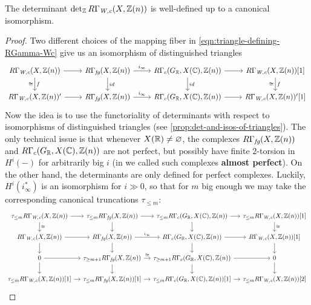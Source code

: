 \documentclass{article}
\numberwithin{equation}{section}
\begin{document}
\begin{lemma}
  \label{lemma:determinant-of-RGamma-Wc-well-defined}
  The determinant $\operatorname{det}_{\mathbb{Z}} R\Gamma_{\text{\it W,c}} (X, \mathbb{Z}(n))$ is well-defined up to a
  canonical isomorphism.

  \begin{proof}
    Two different choices of the mapping fiber in
    \eqref{eqn:triangle-defining-RGamma-Wc} give us an isomorphism of
    distinguished triangles
    \[ \begin{tikzcd}
        R\Gamma_\Wc (X, \ZZ(n)) \ar{r}\ar{d}{f}[swap]{\cong} & R\Gamma_\fg (X,\ZZ(n)) \ar{r}{i_\infty}\ar{d}{id} & R\Gamma_c (G_\RR, X (\CC), \ZZ (n)) \ar{r}\ar{d}{id} & R\Gamma_\Wc (X, \ZZ (n)) [1]\ar{d}{f}[swap]{\cong} \\
        R\Gamma_\Wc (X, \ZZ(n))' \ar{r} & R\Gamma_\fg (X,\ZZ(n)) \ar{r}{i_\infty} & R\Gamma_c (G_\RR, X (\CC), \ZZ (n)) \ar{r} & R\Gamma_\Wc (X, \ZZ (n))' [1]
      \end{tikzcd} \]
    Now the idea is to use the functoriality of determinants with respect to
    isomorphisms of distinguished triangles
    (see \ref{prop:det-and-isos-of-triangles}). The only technical issue is that
    whenever $X (\mathbb{R}) \ne \varnothing$, the complexes $R\Gamma_{\text{\it fg}} (X,\mathbb{Z}(n))$ and
    $R\Gamma_c (G_{\mathbb{R}}, X (\mathbb{C}), \mathbb{Z} (n))$ are not perfect, but possibly have
    finite $2$-torsion in $H^i (-)$ for arbitrarily big $i$ (in
    \cite{Beshenov-Weil-etale-1} we called such complexes
    \textbf{almost perfect}). On the other hand, the determinants are only
    defined for perfect complexes. Luckily, $H^i (i_\infty^*)$ is an isomorphism
    for $i \gg 0$, so that for $m$ big enough we may take the corresponding
    canonical truncations $\tau_{\le m}$:
    \[ \begin{tikzcd}[row sep=1.5em, column sep=1em]
        \tau_{\le m} R\Gamma_\Wc (X, \ZZ(n)) \ar{r}\ar{d}{\cong} & \tau_{\le m} R\Gamma_\fg (X,\ZZ(n)) \ar{r}\ar{d} & \tau_{\le m} R\Gamma_c (G_\RR, X (\CC), \ZZ (n)) \ar{r}\ar{d} & \tau_{\le m} R\Gamma_\Wc (X, \ZZ (n)) [1]\ar{d}{\cong} \\
        R\Gamma_\Wc (X, \ZZ(n)) \ar{r}\ar{d} & R\Gamma_\fg (X,\ZZ(n)) \ar{r}{i_\infty}\ar{d} & R\Gamma_c (G_\RR, X (\CC), \ZZ (n)) \ar{r}\ar{d} & R\Gamma_\Wc (X, \ZZ (n)) [1]\ar{d} \\
        0 \ar{r}\ar{d} & \tau_{\ge m+1} R\Gamma_\fg (X,\ZZ(n)) \ar{r}{\cong}\ar{d} & \tau_{\ge m+1} R\Gamma_c (G_\RR, X (\CC), \ZZ (n)) \ar{r}\ar{d} & 0\ar{d} \\
        \tau_{\le m} R\Gamma_\Wc (X, \ZZ(n)) [1] \ar{r} & \tau_{\le m} R\Gamma_\fg (X,\ZZ(n)) [1] \ar{r} & \tau_{\le m} R\Gamma_c (G_\RR, X (\CC), \ZZ (n)) [1] \ar{r} & \tau_{\le m} R\Gamma_\Wc (X, \ZZ (n)) [2]
      \end{tikzcd} \]


\end{proof}
\end{lemma}
\end{document}
